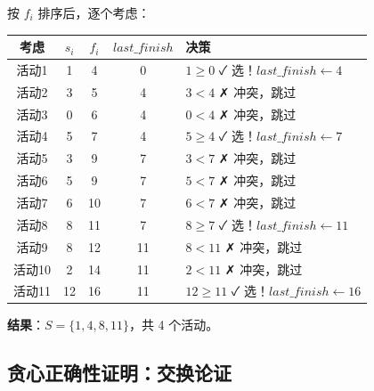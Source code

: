 \documentclass[12pt, a4paper]{ctexart}
\begin{document}
\begin{blackboard}[手算过程]

按 $f_i$ 排序后，逐个考虑：

\begin{center}
\begin{tabular}{c|c|c|c|l}
\textbf{考虑} & $s_i$ & $f_i$ & $last\_finish$ & \textbf{决策} \\
\hline
活动1 & 1 & 4 & 0 & $1 \geq 0$ ✓ 选！$last\_finish \gets 4$ \\
活动2 & 3 & 5 & 4 & $3 < 4$ ✗ 冲突，跳过 \\
活动3 & 0 & 6 & 4 & $0 < 4$ ✗ 冲突，跳过 \\
活动4 & 5 & 7 & 4 & $5 \geq 4$ ✓ 选！$last\_finish \gets 7$ \\
活动5 & 3 & 9 & 7 & $3 < 7$ ✗ 冲突，跳过 \\
活动6 & 5 & 9 & 7 & $5 < 7$ ✗ 冲突，跳过 \\
活动7 & 6 & 10 & 7 & $6 < 7$ ✗ 冲突，跳过 \\
活动8 & 8 & 11 & 7 & $8 \geq 7$ ✓ 选！$last\_finish \gets 11$ \\
活动9 & 8 & 12 & 11 & $8 < 11$ ✗ 冲突，跳过 \\
活动10 & 2 & 14 & 11 & $2 < 11$ ✗ 冲突，跳过 \\
活动11 & 12 & 16 & 11 & $12 \geq 11$ ✓ 选！$last\_finish \gets 16$ \\
\end{tabular}
\end{center}

\textbf{结果}：$S = \{1, 4, 8, 11\}$，共 4 个活动。

\end{blackboard}

\subsection{贪心正确性证明：交换论证}
\end{document}
